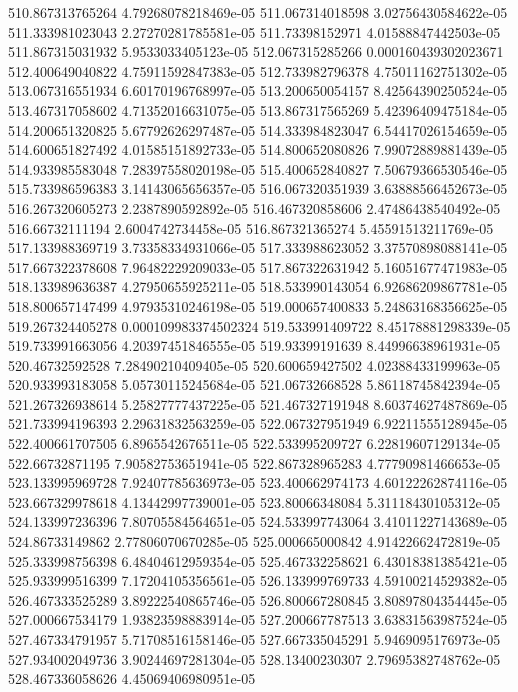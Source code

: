 {510.867313765264 4.79268078218469e-05
511.067314018598 3.02756430584622e-05
511.333981023043 2.27270281785581e-05
511.73398152971 4.01588847442503e-05
511.867315031932 5.9533033405123e-05
512.067315285266 0.000160439302023671
512.400649040822 4.75911592847383e-05
512.733982796378 4.75011162751302e-05
513.067316551934 6.60170196768997e-05
513.200650054157 8.42564390250524e-05
513.467317058602 4.71352016631075e-05
513.867317565269 5.42396409475184e-05
514.200651320825 5.67792626297487e-05
514.333984823047 6.54417026154659e-05
514.600651827492 4.01585151892733e-05
514.800652080826 7.99072889881439e-05
514.933985583048 7.28397558020198e-05
515.400652840827 7.50679366530546e-05
515.733986596383 3.14143065656357e-05
516.067320351939 3.63888566452673e-05
516.267320605273 2.2387890592892e-05
516.467320858606 2.47486438540492e-05
516.66732111194 2.6004742734458e-05
516.867321365274 5.45591513211769e-05
517.133988369719 3.73358334931066e-05
517.333988623052 3.37570898088141e-05
517.667322378608 7.96482229209033e-05
517.867322631942 5.16051677471983e-05
518.133989636387 4.27950655925211e-05
518.533990143054 6.92686209867781e-05
518.800657147499 4.97935310246198e-05
519.000657400833 5.24863168356625e-05
519.267324405278 0.000109983374502324
519.533991409722 8.45178881298339e-05
519.733991663056 4.20397451846555e-05
519.93399191639 8.44996638961931e-05
520.46732592528 7.28490210409405e-05
520.600659427502 4.02388433199963e-05
520.933993183058 5.05730115245684e-05
521.06732668528 5.86118745842394e-05
521.267326938614 5.25827777437225e-05
521.467327191948 8.60374627487869e-05
521.733994196393 2.29631832563259e-05
522.067327951949 6.92211555128945e-05
522.400661707505 6.8965542676511e-05
522.533995209727 6.22819607129134e-05
522.66732871195 7.90582753651941e-05
522.867328965283 4.77790981466653e-05
523.133995969728 7.92407785636973e-05
523.400662974173 4.60122262874116e-05
523.667329978618 4.13442997739001e-05
523.80066348084 5.31118430105312e-05
524.133997236396 7.80705584564651e-05
524.533997743064 3.41011227143689e-05
524.86733149862 2.77806070670285e-05
525.000665000842 4.91422662472819e-05
525.333998756398 6.48404612959354e-05
525.467332258621 6.43018381385421e-05
525.933999516399 7.17204105356561e-05
526.133999769733 4.59100214529382e-05
526.467333525289 3.89222540865746e-05
526.800667280845 3.80897804354445e-05
527.000667534179 1.93823598883914e-05
527.200667787513 3.63831563987524e-05
527.467334791957 5.71708516158146e-05
527.667335045291 5.9469095176973e-05
527.934002049736 3.90244697281304e-05
528.13400230307 2.79695382748762e-05
528.467336058626 4.45069406980951e-05
}
